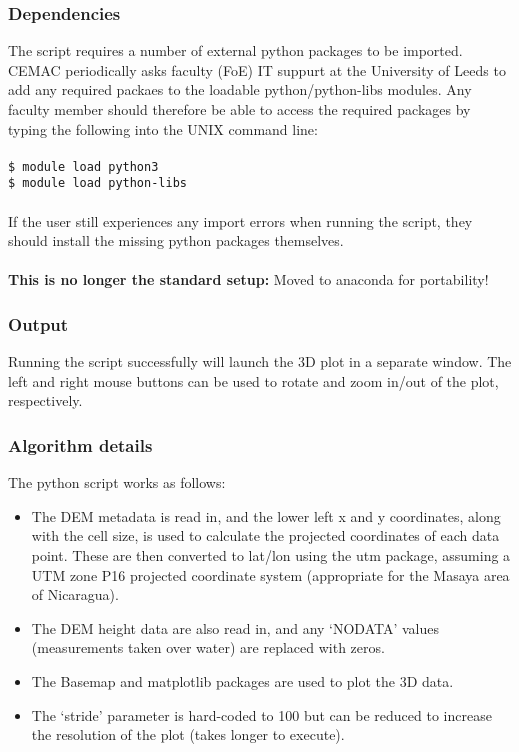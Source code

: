 \documentclass[10pt,a4paper]{article}
\newcommand\tab[1][0.5cm]{\hspace*{#1}}
\begin{document}
\subsubsection{Dependencies}
The script requires a number of external python packages to be imported. CEMAC periodically asks faculty (FoE) IT suppurt at the University of Leeds to add any required packaes to the loadable python/python-libs modules. Any faculty member should therefore be able to access the required packages by typing the following into the UNIX command line:\\\\
\tab \texttt{\$ module load python3}\\
\tab \texttt{\$ module load python-libs}\\\\
If the user still experiences any import errors when running the script, they should install the missing python packages themselves.\\\\
\textbf{This is no longer the standard setup:} Moved to anaconda for portability!

\subsubsection{Output}
Running the script successfully will launch the 3D plot in a separate window. The left and right mouse buttons can be used to rotate and zoom in/out of the plot, respectively.

\subsubsection{Algorithm details}
The python script works as follows:
\begin{itemize}
\item The DEM metadata is read in, and the lower left x and y coordinates, along with the cell size, is used to calculate the projected coordinates of each data point. These are then converted to lat/lon using the utm package, assuming a UTM zone P16 projected coordinate system (appropriate for the Masaya area of Nicaragua).
\item The DEM height data are also read in, and any `NODATA' values (measurements taken over water) are replaced with zeros.
\item The Basemap and matplotlib packages are used to plot the 3D data.
\item The `stride' parameter is hard-coded to 100 but can be reduced to increase the resolution of the plot (takes longer to execute).
\end{itemize}
\end{document}
